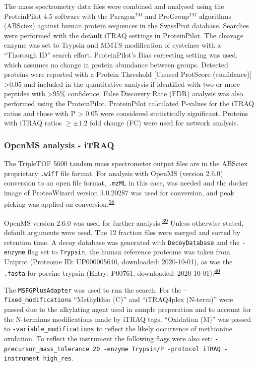 \documentclass[
]{article}
\begin{document}
The mass spectrometry data files were combined and analysed using the ProteinPilot 4.5 software with the Paragon\(^{TM}\) and ProGroup\(^{TM}\) algorithms (ABSciex) against human protein sequences in the SwissProt database.
Searches were performed with the default iTRAQ settings in ProteinPilot.
The cleavage enzyme was set to Trypsin and MMTS modification of cysteines with a ``Thorough ID'' search effort.
ProteinPilot's Bias correcting setting was used, which assumes no change in protein abundance between groups.
Detected proteins were reported with a Protein Threshold {[}Unused ProtScore (confidence){]} \textgreater0.05 and included in the quantitative analysis if identified with two or more peptides with \textgreater95\% confidence.
False Discovery Rate (FDR) analysis was also performed using the ProteinPilot.
ProteinPilot calculated P-values for the iTRAQ ratios and those with P \textgreater{} 0.05 were considered statistically significant.
Proteins with iTRAQ ratios \(\ge\pm1.2\) fold change (FC) were used for network analysis.

\hypertarget{openms-chap3}{%
\subsubsection{OpenMS analysis - iTRAQ}\label{openms-chap3}}

The TripleTOF 5600 tandem mass spectrometer output files are in the ABSciex proprietary \texttt{.wiff} file format.
For analysis with OpenMS (version 2.6.0) conversion to an open file format, \texttt{.mzML} in this case, was needed and the docker image of ProteoWizard version 3.0.20287 was used for conversion, and peak picking was applied on conversion.\textsuperscript{\protect\hyperlink{ref-chambers_cross-platform_2012}{38}}

OpenMS version 2.6.0 was used for further analysis.\textsuperscript{\protect\hyperlink{ref-rost_openms_2016}{39}}
Unless otherwise stated, default arguments were used.
The 12 fraction files were merged and sorted by retention time.
A decoy database was generated with \texttt{DecoyDatabase} and the \texttt{-enzyme} flag set to \texttt{Trypsin}, the human reference proteome was taken from Uniprot (Proteome ID: UP000005640, downloaded: 2020-10-01), as was the \texttt{.fasta} for porcine trypsin (Entry: P00761, downloaded: 2020-10-01).\textsuperscript{\protect\hyperlink{ref-the_uniprot_consortium_uniprot_2021}{40}}

The \texttt{MSFGPlusAdapter} was used to run the search.
For the \texttt{-fixed\_modifications} ``Methylthio (C)'' and ``iTRAQ4plex (N-term)'' were passed due to the alkylating agent used in sample preperation and to account for the N-terminus modifications made by iTRAQ tags.
``Oxidation (M)'' was passed to \texttt{-variable\_modifications} to reflect the likely occurrence of methionine oxidation.
To reflect the instrument the following flags were also set: \texttt{-precursor\_mass\_tolerance\ 20\ -enzyme\ Trypsin/P\ -protocol\ iTRAQ\ -instrument\ high\_res}.
\end{document}
